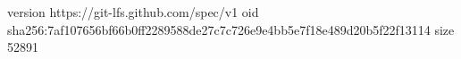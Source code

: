 version https://git-lfs.github.com/spec/v1
oid sha256:7af107656bf66b0ff2289588de27c7c726e9e4bb5e7f18e489d20b5f22f13114
size 52891
